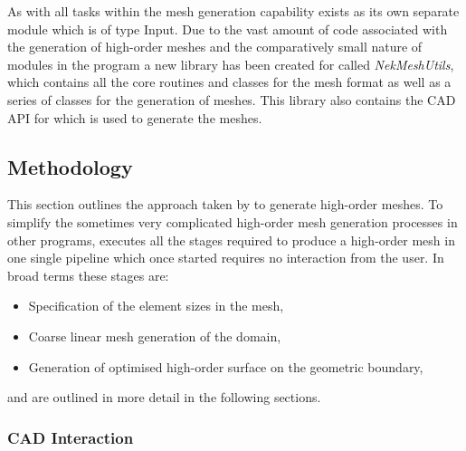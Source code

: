 As with all tasks within \nm the mesh generation capability exists as its
own separate module which is of type Input. Due to the vast amount of code
associated with the generation of high-order meshes and the comparatively small
nature of modules in the \nm program a new library has been created for \nekpp
called {\em NekMeshUtils}, which contains all the core routines and classes for
the \nm mesh format as well as a series of classes for the generation of meshes.
This library also contains the CAD API for \nekpp which is used to generate the
meshes.

\subsection{Methodology}

This section outlines the approach taken by \nm to generate high-order meshes.
%
To simplify the sometimes very complicated high-order mesh generation processes
in other programs, \nm executes all the stages required to produce a high-order
mesh in one single pipeline which once started requires no interaction from the
user. In broad terms these stages are:
\begin{itemize}
	\item Specification of the element sizes in the mesh,
	\item Coarse linear mesh generation of the domain,
	\item Generation of optimised high-order surface on the geometric boundary,
\end{itemize}
%
and are outlined in more detail in the following sections.

\subsubsection{CAD Interaction}

